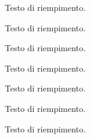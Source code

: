 \documentclass[a4paper]{article}
\begin{document}
\htmlcut

\Unit Testo di riempimento.

\Figskip{{2cm}}

\Unit Testo di riempimento.


\Unit Testo di riempimento.

\Figskip{{2cm}[\VF{{*:$Y$}{B:$V$}}]}

\Unit Testo di riempimento.


\Unit Testo di riempimento.

\Figskip{{2cm}[\VF{{A:$Y$}{B:$V$}}]}

\Unit Testo di riempimento.


\Unit Testo di riempimento.
\end{document}
